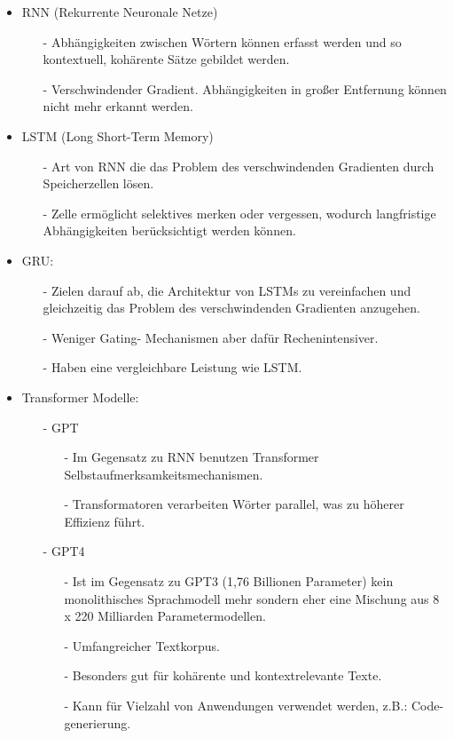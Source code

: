\documentclass[12pt]{article}
\begin{document}
\begin{itemize}
	\item RNN (Rekurrente Neuronale Netze)
	\begin{itemize}
        \item[-] Abhängigkeiten zwischen Wörtern können erfasst werden und so kontextuell, kohärente Sätze gebildet werden.
        \item[-] Verschwindender Gradient. Abhängigkeiten in großer Entfernung können nicht mehr erkannt werden.
    \end{itemize}
	\item LSTM (Long Short-Term Memory)
	\begin{itemize}
        \item[-] Art von RNN die das Problem des verschwindenden Gradienten durch Speicherzellen lösen.
        \item[-] Zelle ermöglicht selektives merken oder vergessen, wodurch langfristige Abhängigkeiten berücksichtigt werden können.
    \end{itemize}
	\item GRU:
	\begin{itemize}
        \item[-] Zielen darauf ab, die Architektur von LSTMs zu vereinfachen und gleichzeitig das Problem des verschwindenden Gradienten anzugehen.
        \item[-] Weniger Gating- Mechanismen aber dafür Rechenintensiver.
        \item[-] Haben eine vergleichbare Leistung wie LSTM.
    \end{itemize}
	\item Transformer Modelle:
	\begin{itemize}
		\item[-] GPT
		\begin{itemize}
			\item[-] Im Gegensatz zu RNN benutzen Transformer Selbstaufmerksamkeitsmechanismen.
			\item[-] Transformatoren verarbeiten Wörter parallel, was zu höherer Effizienz führt.
		\end{itemize}
        \item[-] GPT4
		\begin{itemize}
			\item[-] Ist im Gegensatz zu GPT3 (1,76 Billionen Parameter) kein monolithisches Sprachmodell mehr sondern eher eine Mischung aus 8 x 220 Milliarden Parametermodellen. \cite{Spriesterbach2023}
			\item[-] Umfangreicher Textkorpus.
			\item[-] Besonders gut für kohärente und kontextrelevante Texte.
			\item[-] Kann für Vielzahl von Anwendungen verwendet werden, z.B.: Code-generierung.
		\end{itemize}
    \end{itemize}
\end{itemize}
\end{document}
